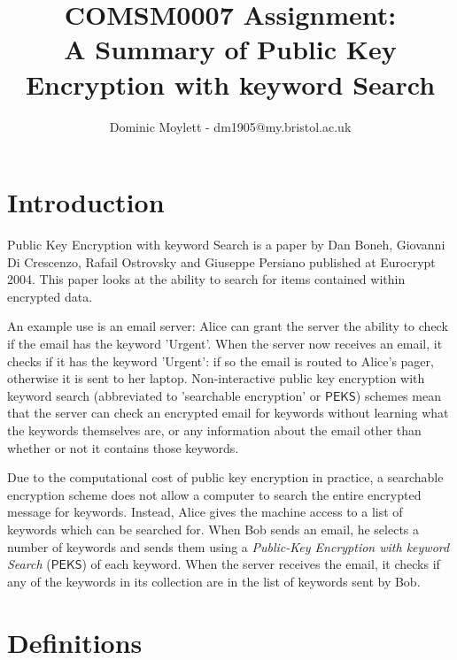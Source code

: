 \documentclass[a4paper,11pt]{article}
\title{COMSM0007 Assignment:\\A Summary of Public Key Encryption with keyword Search}
\author{Dominic Moylett - dm1905@my.bristol.ac.uk}
\begin{document}
    \maketitle

    \section{Introduction}

    Public Key Encryption with keyword Search\cite{cryptoeprint:2003:195} is a paper by Dan Boneh, Giovanni Di Crescenzo, Rafail Ostrovsky and Giuseppe Persiano published at Eurocrypt 2004. This paper looks at the ability to search for items contained within encrypted data.

    An example use is an email server: Alice can grant the server the ability to check if the email has the keyword 'Urgent'. When the server now receives an email, it checks if it has the keyword 'Urgent': if so the email is routed to Alice's pager, otherwise it is sent to her laptop. Non-interactive public key encryption with keyword search (abbreviated to 'searchable encryption' or $\mathsf{PEKS}$) schemes mean that the server can check an encrypted email for keywords without learning what the keywords themselves are, or any information about the email other than whether or not it contains those keywords.

    Due to the computational cost of public key encryption in practice, a searchable encryption scheme does not allow a computer to search the entire encrypted message for keywords. Instead, Alice gives the machine access to a list of keywords which can be searched for. When Bob sends an email, he selects a number of keywords and sends them using a \textit{Public-Key Encryption with keyword Search} ($\mathsf{PEKS}$) of each keyword. When the server receives the email, it checks if any of the keywords in its collection are in the list of keywords sent by Bob.

    \section{Definitions}
\end{document}
